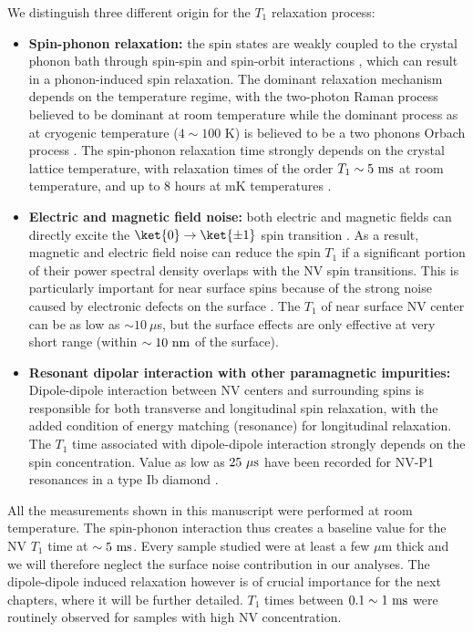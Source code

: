 \documentclass[a4paper, 11pt]{report}
\begin{document}
We distinguish three different origin for the $T_1$ relaxation process:
\begin{itemize}
\item \textbf{Spin-phonon relaxation:} the spin states are weakly coupled to the crystal phonon bath through spin-spin and spin-orbit interactions \citep{norambuena2018spin}, which can result in a phonon-induced spin relaxation. The dominant relaxation mechanism depends on the temperature regime, with the two-photon Raman process believed to be dominant at room temperature \citep{takahashi2008quenching, jarmola2012temperature} while the dominant process as at cryogenic temperature ($4\sim100$ K) is believed to be a two phonons Orbach process \citep{redman1991spin, norambuena2018spin}. The spin-phonon relaxation time strongly depends on the crystal lattice temperature, with relaxation times of the order $T_1 \sim 5\ \rm ms$ at room temperature, and up to 8 hours at mK temperatures \citep{astner2018solid}.

\item \textbf{Electric and magnetic field noise:} both electric and magnetic fields can directly excite the $\ket{0} \to \ket{\pm 1}$ spin transition \citep{udvarhelyi2018spin}. As a result, magnetic and electric field noise can reduce the spin $T_1$ if a significant portion of their power spectral density overlaps with the NV spin transitions. This is particularly important for near surface spins because of the strong noise caused by electronic defects on the surface \citep{sangtawesin2019origins}. The $T_1$ of near surface NV center can be as low as $\sim 10\ \mu$s, but the surface effects are only effective at very short range (within $\sim 10\ \rm nm$ of the surface).

\item \textbf{Resonant dipolar interaction with other paramagnetic impurities:} Dipole-dipole interaction between NV centers and surrounding spins is responsible for both transverse and longitudinal spin relaxation, with the added condition of energy matching (resonance) for longitudinal relaxation. The $T_1$ time associated with dipole-dipole interaction strongly depends on the spin concentration. Value as low as $25\ \rm{\mu s}$ have been recorded for NV-P1 resonances in a type Ib diamond \citep{hall2016detection}.
\end{itemize}

All the measurements shown in this manuscript were performed at room temperature. The spin-phonon interaction thus creates a baseline value for the NV $T_1$ time at $\sim 5\ \rm ms$. Every sample studied were at least a few $\mu$m thick and we will therefore neglect the surface noise contribution in our analyses. The dipole-dipole induced relaxation however is of crucial importance for the next chapters, where it will be further detailed. $T_1$ times between $0.1 \sim 1\ \rm ms$ were routinely observed for samples with high NV concentration.
\end{document}
